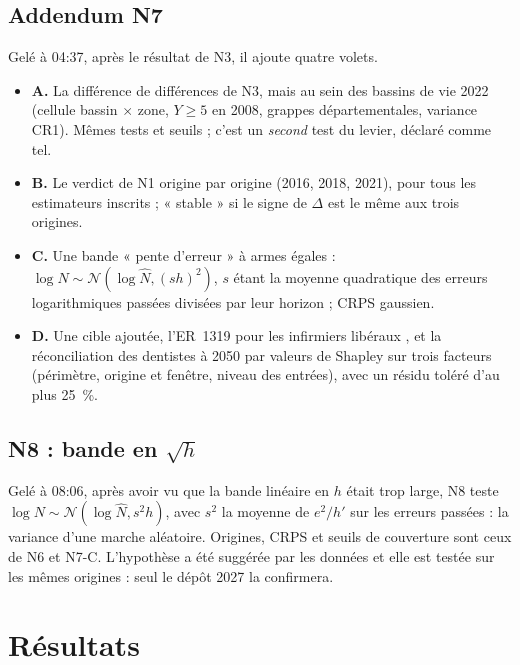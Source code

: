 \documentclass[11pt]{article}
\begin{document}
\subsection{Addendum N7}
Gelé à 04:37, après le résultat de N3, il ajoute quatre volets.
\begin{itemize}
  \item \textbf{A.} La différence de différences de N3, mais au sein des bassins de vie 2022 (cellule
        bassin $\times$ zone, $Y \ge 5$\suppose{} en 2008, grappes départementales, variance CR1). Mêmes
        tests et seuils ; c'est un \emph{second} test du levier, déclaré comme tel.
  \item \textbf{B.} Le verdict de N1 origine par origine (2016, 2018, 2021), pour tous les estimateurs
        inscrits ; « stable » si le signe de $\Delta$ est le même aux trois origines.
  \item \textbf{C.} Une bande « pente d'erreur » à armes égales :
        $\log N \sim \mathcal N(\log \hat N, (s h)^2)$, $s$ étant la moyenne quadratique des erreurs
        logarithmiques passées divisées par leur horizon ; CRPS gaussien.
  \item \textbf{D.} Une cible ajoutée, l'ER~1319 pour les infirmiers libéraux \citep{er1319}, et la
        réconciliation des dentistes à 2050 par valeurs de Shapley sur trois facteurs (périmètre,
        origine et fenêtre, niveau des entrées), avec un résidu toléré d'au plus 25\suppose{}~\%.
\end{itemize}

\subsection{N8 : bande en $\sqrt h$}
Gelé à 08:06, après avoir vu que la bande linéaire en $h$ était trop large, N8 teste
$\log N \sim \mathcal N(\log \hat N, s^2 h)$, avec $s^2$ la moyenne de $e^2/h'$ sur les erreurs passées :
la variance d'une marche aléatoire. Origines, CRPS et seuils de couverture sont ceux de N6 et N7-C.
L'hypothèse a été suggérée par les données et elle est testée sur les mêmes origines : seul le dépôt
2027 la confirmera.

\section{Résultats}\label{sec:resultats}
\end{document}
